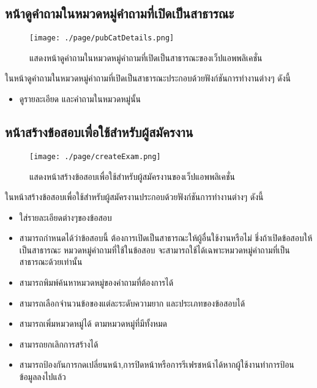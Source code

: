 \subsection{หน้าดูคำถามในหมวดหมู่คำถามที่เปิดเป็นสาธารณะ}
\begin{figure}[H]
  \centering
  \texttt{[image: ./page/pubCatDetails.png]}
  \caption{แสดงหน้าดูคำถามในหมวดหมู่คำถามที่เปิดเป็นสาธารณะของเว็ปแอพพลิเคชั่น}
  \label{Fig:pubCatDetail}
\end{figure}
ในหน้าดูคำถามในหมวดหมู่คำถามที่เปิดเป็นสาธารณะประกอบด้วยฟังก์ชันการทำงานต่างๆ ดังนี้
\begin{itemize}
  \item ดูรายละเอียด และคำถามในหมวดหมู่นั้น
\end{itemize}

\subsection{หน้าสร้างข้อสอบเพื่อใช้สำหรับผู้สมัครงาน}
\begin{figure}[H]
  \centering
  \texttt{[image: ./page/createExam.png]}
  \caption{แสดงหน้าสร้างข้อสอบเพื่อใช้สำหรับผู้สมัครงานของเว็ปแอพพลิเคชั่น}
  \label{Fig:createExam}
\end{figure}
ในหน้าสร้างข้อสอบเพื่อใช้สำหรับผู้สมัครงานประกอบด้วยฟังก์ชันการทำงานต่างๆ ดังนี้
\begin{itemize}
    \item ใส่รายละเอียดต่างๆของข้อสอบ
    \item สามารถกำหนดได้ว่าข้อสอบนี้ ต้องการเปิดเป็นสาธารณะให้ผู้อื่นใช้งานหรือไม่ ชึ่งถ้าเปิดข้อสอบให้เป็นสาธารณะ หมวดหมู่คำถามที่ใช้ในข้อสอบ จะสามารถใช้ได้เฉพาะหมวดหมู่คำถามที่เป็นสาธารณะด้วยเท่านั้น
    \item สามารถพิมพ์ค้นหาหมวดหมู่ของคำถามที่ต้องการได้
    \item สามารถเลือกจำนวนข้อของแต่ละระดับความยาก และประเภทของข้อสอบได้
    \item สามารถเพิ่มหมวดหมู่ได้ ตามหมวดหมู่ที่มีทั้งหมด
    \item สามารถยกเลิกการสร้างได้
    \item สามารถป้องกันการกดเปลี่ยนหน้า,การปิดหน้าหรือการรีเฟรชหน้าได้หากผู้ใช้งานทําการป้อน ข้อมูลลงไปแล้ว
\end{itemize}

